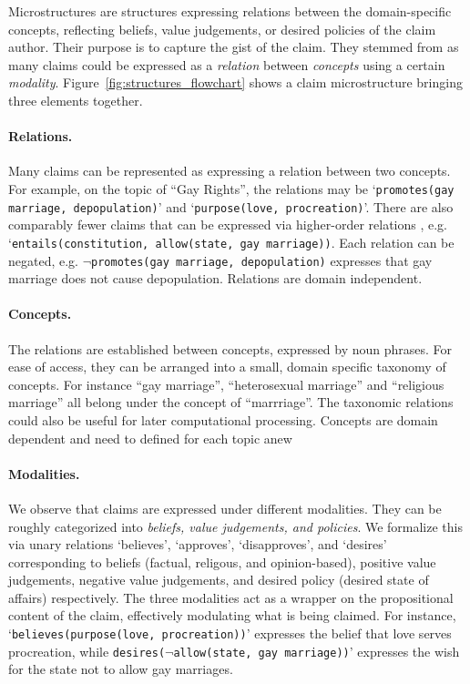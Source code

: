 Microstructures are structures expressing relations between the domain-specific
concepts, reflecting beliefs, value judgements, or desired policies of the claim
author. Their purpose is to capture the gist of the claim. 
They stemmed from as many claims could be expressed as a \emph{relation}
between \emph{concepts} using a certain \emph{modality}. 
Figure~\ref{fig:structures_flowchart} shows a claim microstructure bringing three elements 
together. 

\paragraph{Relations. }  Many claims can be represented as expressing a
relation between two concepts. For example, on the topic of ``Gay Rights'', 
the relations may be `\texttt{promotes(gay marriage, depopulation)}' and 
`\texttt{purpose(love, procreation)}'. 
There are also comparably fewer claims that can be expressed via
higher-order relations , e.g. `\texttt{entails(constitution, allow(state, gay marriage))}. 
Each relation can be negated, e.g. $\neg$\texttt{promotes(gay marriage,
depopulation)} expresses that gay marriage does not cause depopulation. 
Relations are domain independent. 

\paragraph{Concepts. }
The relations are established between concepts, expressed by noun phrases. 
For ease of access, they can be arranged into a small, domain specific taxonomy of concepts. 
For instance ``gay marriage'', ``heterosexual marriage'' and ``religious marriage''
all belong under the concept of ``marrriage''. 
The taxonomic relations could also be useful for later computational processing. 
Concepts are domain dependent and need to defined for each topic anew

\paragraph{Modalities. }
We observe that claims are expressed under different modalities. 
They can be roughly categorized into \textit{beliefs, value judgements, and policies}. 
We formalize this via unary relations `believes', `approves', `disapproves',
and `desires' corresponding 
to beliefs (factual, religous, and opinion-based), positive value judgements, negative value 
judgements, and desired policy (desired state of affairs) respectively. 
The three modalities act as a wrapper on the propositional content of the claim, 
effectively modulating what is being claimed. 
For instance, `\texttt{believes(purpose(love, procreation))}' expresses the belief 
that love serves procreation, while \texttt{desires(}$\neg$\texttt{allow(state, gay marriage))}'
expresses the wish for the state not to allow gay marriages. 

